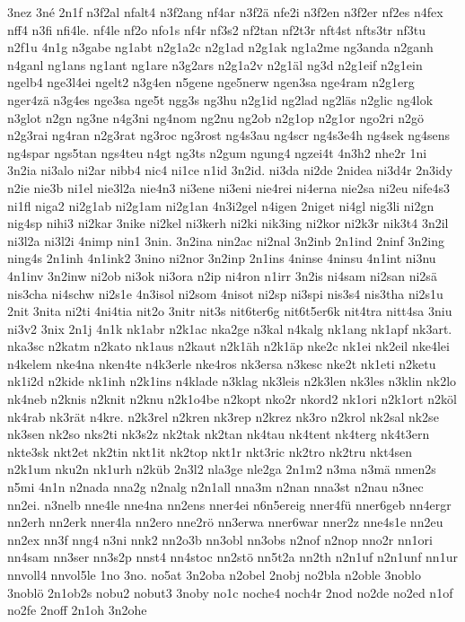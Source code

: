 {3nez
3né
2n1f
n3f2al
nfalt4
n3f2ang
nf4ar
n3f2ä
nfe2i
n3f2en
n3f2er
nf2es
n4fex
nff4
n3fi
nfi4le.
nf4le
nf2o
nfo1s
nf4r
nf3s2
nf2tan
nf2t3r
nft4st
nfts3tr
nf3tu
n2f1u
4n1g
n3gabe
ng1abt
n2g1a2c
n2g1ad
n2g1ak
ng1a2me
ng3anda
n2ganh
n4ganl
ng1ans
ng1ant
ng1are
n3g2ars
n2g1a2v
n2g1äl
ng3d
n2g1eif
n2g1ein
ngelb4
nge3l4ei
ngelt2
n3g4en
n5gene
nge5nerw
ngen3sa
nge4ram
n2g1erg
nger4zä
n3g4es
nge3sa
nge5t
ngg3s
ng3hu
n2g1id
ng2lad
ng2läs
n2glic
ng4lok
n3glot
n2gn
ng3ne
n4g3ni
ng4nom
ng2nu
ng2ob
n2g1op
n2g1or
ngo2ri
n2gö
n2g3rai
ng4ran
n2g3rat
ng3roc
ng3rost
ng4s3au
ng4scr
ng4s3e4h
ng4sek
ng4sens
ng4spar
ngs5tan
ngs4teu
n4gt
ng3ts
n2gum
ngung4
ngzei4t
4n3h2
nhe2r
1ni
3n2ia
ni3alo
ni2ar
nibb4
nic4
ni1ce
n1id
3n2id.
ni3da
ni2de
2nidea
ni3d4r
2n3idy
n2ie
nie3b
ni1el
nie3l2a
nie4n3
ni3ene
ni3eni
nie4rei
ni4erna
nie2sa
ni2eu
nife4s3
ni1fl
niga2
ni2g1ab
ni2g1am
ni2g1an
4n3i2gel
n4igen
2niget
ni4gl
nig3li
ni2gn
nig4sp
nihi3
ni2kar
3nike
ni2kel
ni3kerh
ni2ki
nik3ing
ni2kor
ni2k3r
nik3t4
3n2il
ni3l2a
ni3l2i
4nimp
nin1
3nin.
3n2ina
nin2ac
ni2nal
3n2inb
2n1ind
2ninf
3n2ing
ning4s
2n1inh
4n1ink2
3nino
ni2nor
3n2inp
2n1ins
4ninse
4ninsu
4n1int
ni3nu
4n1inv
3n2inw
ni2ob
ni3ok
ni3ora
n2ip
ni4ron
n1irr
3n2is
ni4sam
ni2san
ni2sä
nis3cha
ni4schw
ni2s1e
4n3isol
ni2som
4nisot
ni2sp
ni3spi
nis3s4
nis3tha
ni2s1u
2nit
3nita
ni2ti
4ni4tia
nit2o
3nitr
nit3s
nit6ter6g
nit6t5er6k
nit4tra
nitt4sa
3niu
ni3v2
3nix
2n1j
4n1k
nk1abr
n2k1ac
nka2ge
n3kal
n4kalg
nk1ang
nk1apf
nk3art.
nka3sc
n2katm
n2kato
nk1aus
n2kaut
n2k1äh
n2k1äp
nke2c
nk1ei
nk2eil
nke4lei
n4kelem
nke4na
nken4te
n4k3erle
nke4ros
nk3ersa
n3kesc
nke2t
nk1eti
n2ketu
nk1i2d
n2kide
nk1inh
n2k1ins
n4klade
n3klag
nk3leis
n2k3len
nk3les
n3klin
nk2lo
nk4neb
n2knis
n2knit
n2knu
n2k1o4be
n2kopt
nko2r
nkord2
nk1ori
n2k1ort
n2köl
nk4rab
nk3rät
n4kre.
n2k3rel
n2kren
nk3rep
n2krez
nk3ro
n2krol
nk2sal
nk2se
nk3sen
nk2so
nks2ti
nk3s2z
nk2tak
nk2tan
nk4tau
nk4tent
nk4terg
nk4t3ern
nkte3sk
nkt2et
nk2tin
nkt1it
nk2top
nkt1r
nkt3ric
nk2tro
nk2tru
nkt4sen
n2k1um
nku2n
nk1urh
n2küb
2n3l2
nla3ge
nle2ga
2n1m2
n3ma
n3mä
nmen2s
n5mi
4n1n
n2nada
nna2g
n2nalg
n2n1all
nna3m
n2nan
nna3st
n2nau
n3nec
nn2ei.
n3nelb
nne4le
nne4na
nn2ens
nner4ei
n6n5ereig
nner4fü
nner6geb
nn4ergr
nn2erh
nn2erk
nner4la
nn2ero
nne2rö
nn3erwa
nner6war
nner2z
nne4s1e
nn2eu
nn2ex
nn3f
nng4
n3ni
nnk2
nn2o3b
nn3obl
nn3obs
n2nof
n2nop
nno2r
nn1ori
nn4sam
nn3ser
nn3s2p
nnst4
nn4stoc
nn2stö
nn5t2a
nn2th
n2n1uf
n2n1unf
nn1ur
nnvoll4
nnvol5le
1no
3no.
no5at
3n2oba
n2obel
2nobj
no2bla
n2oble
3noblo
3noblö
2n1ob2s
nobu2
nobut3
3noby
no1c
noche4
noch4r
2nod
no2de
no2ed
n1of
no2fe
2noff
2n1oh
3n2ohe
}
